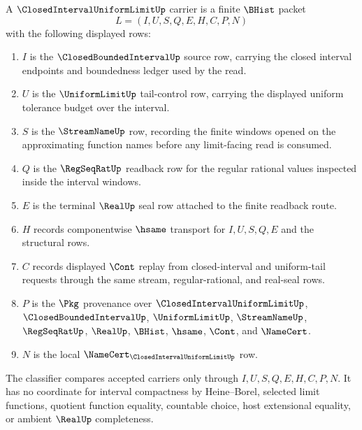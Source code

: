 \begin{definition}
\label{def:closed-interval-uniform-limit-carrier}
A $\ClosedIntervalUniformLimitUp$ carrier is a finite $\BHist$ packet
$$
L=(I,U,S,Q,E,H,C,P,N)
$$
with the following displayed rows:
\begin{enumerate}
\item $I$ is the $\ClosedBoundedIntervalUp$ source row, carrying the closed interval endpoints and boundedness ledger used by the read.
\item $U$ is the $\UniformLimitUp$ tail-control row, carrying the displayed uniform tolerance budget over the interval.
\item $S$ is the $\StreamNameUp$ row, recording the finite windows opened on the approximating function names before any limit-facing read is consumed.
\item $Q$ is the $\RegSeqRatUp$ readback row for the regular rational values inspected inside the interval windows.
\item $E$ is the terminal $\RealUp$ seal row attached to the finite readback route.
\item $H$ records componentwise $\hsame$ transport for $I,U,S,Q,E$ and the structural rows.
\item $C$ records displayed $\Cont$ replay from closed-interval and uniform-tail requests through the same stream, regular-rational, and real-seal rows.
\item $P$ is the $\Pkg$ provenance over $\ClosedIntervalUniformLimitUp$, $\ClosedBoundedIntervalUp$, $\UniformLimitUp$, $\StreamNameUp$, $\RegSeqRatUp$, $\RealUp$, $\BHist$, $\hsame$, $\Cont$, and $\NameCert$.
\item $N$ is the local $\NameCert_{\ClosedIntervalUniformLimitUp}$ row.
\end{enumerate}
The classifier compares accepted carriers only through $I,U,S,Q,E,H,C,P,N$. It has no coordinate for interval compactness by Heine--Borel, selected limit functions, quotient function equality, countable choice, host extensional equality, or ambient $\RealUp$ completeness.
\end{definition}

